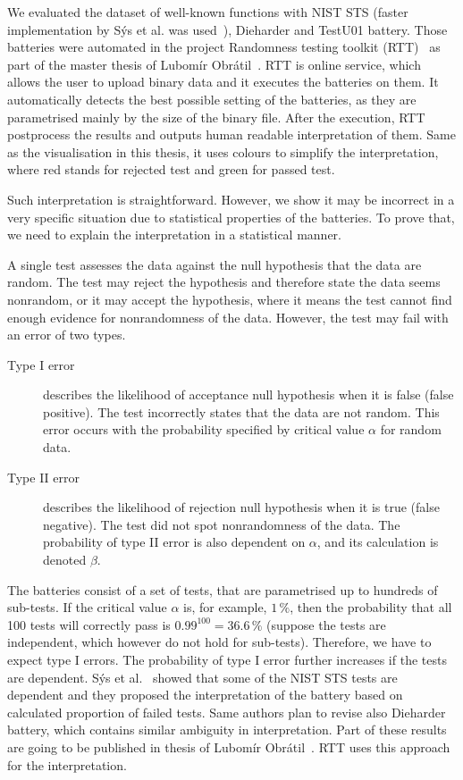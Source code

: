 \documentclass[
  print, %
  Table,   %
  nolof,     %
  nolot,     %
  11pt, %
  oneside  %
]{fithesis3}
\begin{document}

We evaluated the dataset of well-known functions with NIST STS (faster implementation by Sýs et al. was used~\cite{sys2016algorithm}), Dieharder and TestU01 battery. Those batteries were automated in the project Randomness testing toolkit (RTT)~\cite{rttgit} as part of the master thesis of Lubomír Obrátil~\cite{obratilMgrThesis}. RTT is online service, which allows the user to upload binary data and it executes the batteries on them. It automatically detects the best possible setting of the batteries, as they are parametrised mainly by the size of the binary file. After the execution, RTT postprocess the results and outputs human readable interpretation of them. Same as the visualisation in this thesis, it uses colours to simplify the interpretation, where red stands for rejected test and green for passed test.

Such interpretation is straightforward. However, we show it may be incorrect in a very specific situation due to statistical properties of the batteries. To prove that, we need to explain the interpretation in a statistical manner.

A single test assesses the data against the null hypothesis that the data are random. The test may reject the hypothesis and therefore state the data seems nonrandom, or it may accept the hypothesis, where it means the test cannot find enough evidence for nonrandomness of the data. However, the test may fail with an error of two types.

\begin{description}
    \item[Type I error] describes the likelihood of acceptance null hypothesis when it is false (false positive). The test incorrectly states that the data are not random. This error occurs with the probability specified by critical value $\alpha$ for random data.
    \item[Type II error] describes the likelihood of rejection null hypothesis when it is true (false negative). The test did not spot nonrandomness of the data. The probability of type II error is also dependent on $\alpha$, and its calculation is denoted $\beta$.
\end{description}

The batteries consist of a set of tests, that are parametrised up to hundreds of sub-tests. If the critical value $\alpha$ is, for example, $1\,\%$, then the probability that all 100 tests will correctly pass is $0.99^{100}=36.6\,\%$ (suppose the tests are independent, which however do not hold for sub-tests). Therefore, we have to expect type I errors. The probability of type I error further increases if the tests are dependent. Sýs et al.~\cite{sys2015interpretation} showed that some of the NIST STS tests are dependent and they proposed the interpretation of the battery based on calculated proportion of failed tests. Same authors plan to revise also Dieharder battery, which contains similar ambiguity in interpretation. Part of these results are going to be published in thesis of Lubomír Obrátil~\cite{obratilMgrThesis}. RTT uses this approach for the interpretation.
\end{document}
